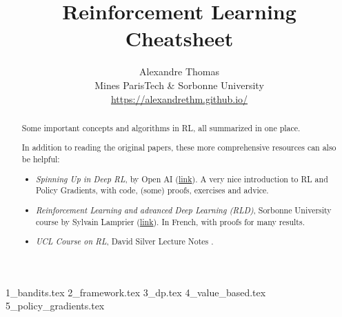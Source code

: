 \documentclass{article}
\title{\Large{Reinforcement Learning Cheatsheet}}
\author{
  Alexandre Thomas\\
  Mines ParisTech \& Sorbonne University\\
  \url{https://alexandrethm.github.io/}
}
\begin{document}
\maketitle

\begin{abstract}
Some important concepts and algorithms in RL, all summarized in one place.

In addition to reading the original papers, these more comprehensive resources can also be helpful:
\begin{itemize}
  \item \emph{Spinning Up in Deep RL}, by Open AI (\href{https://spinningup.openai.com/en/latest/index.html}{link}). A very nice introduction to RL and Policy Gradients, with code, (some) proofs, exercises and advice.
  \item \emph{Reinforcement Learning and advanced Deep Learning (RLD)}, Sorbonne University course by Sylvain Lamprier (\href{https://dac.lip6.fr/master/rladl/}{link}). In French, with proofs for many results.
  \item \emph{UCL Course on RL}, David Silver Lecture Notes \cite{silver2015}.
\end{itemize}
\end{abstract}

\setcounter{tocdepth}{3}
\tableofcontents{}
\newpage

{1_bandits.tex}
{2_framework.tex}
{3_dp.tex}
{4_value_based.tex}
{5_policy_gradients.tex}

\medskip

\footnotesize

\end{document}
